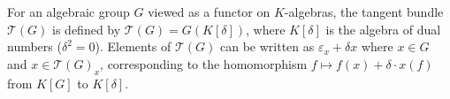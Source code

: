 For an algebraic group $G$ viewed as a functor on $K$-algebras, the tangent bundle $\mathcal{T}(G)$ is defined by $\mathcal{T}(G) = G(K[\delta])$, where $K[\delta]$ is the algebra of dual numbers ($\delta^2 = 0$). Elements of $\mathcal{T}(G)$ can be written as $\varepsilon_x + \delta x$ where $x \in G$ and $x \in \mathcal{T}(G)_x$, corresponding to the homomorphism $f \mapsto f(x) + \delta \cdot x(f)$ from $K[G]$ to $K[\delta]$.
